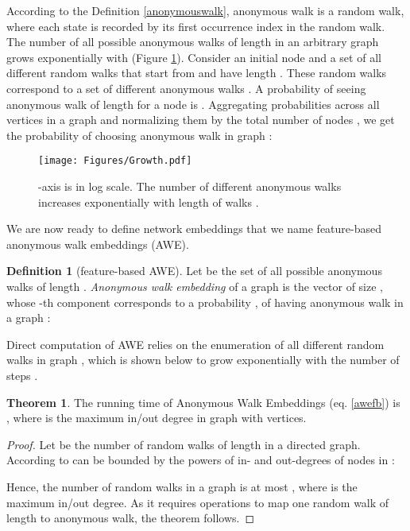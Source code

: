 \documentclass{article}
\theoremstyle{definition}
\newtheorem{definition}{Definition}
\newtheorem{theorem}{Theorem}
\begin{document}
According to the Definition \ref{anonymouswalk}, anonymous walk is a random walk, where each state is recorded by its first occurrence index in the random walk. The number of all possible anonymous walks of length  in an arbitrary graph grows exponentially with  (Figure \ref{growth}). Consider an initial node  and a set of all different random walks  that start from  and have length . These random walks correspond to a set of  different anonymous walks . A probability of seeing anonymous walk  of length  for a node  is . Aggregating probabilities across all vertices in a graph and normalizing them by the total number of nodes , we get the probability of choosing anonymous walk  in graph : 



\begin{figure}[h!]
\centering
    \texttt{[image: Figures/Growth.pdf]}
\caption{-axis is in log scale. The number of different anonymous walks increases exponentially with length of walks . }\label{growth}
\end{figure}

We are now ready to define network embeddings that we name feature-based anonymous walk embeddings (AWE). 
\begin{definition}[feature-based AWE]
Let  be the set of all possible anonymous walks of length . \textit{Anonymous walk embedding} of a graph  is the vector  of size , whose -th component corresponds to a probability , of having anonymous walk  in a graph :

\end{definition}

Direct computation of AWE relies on the enumeration of all different random walks in graph , which is shown below to grow exponentially with the number of steps .

\begin{theorem}
	The running time of Anonymous Walk Embeddings (eq. \ref{awefb}) is , where  is the maximum in/out degree in graph  with  vertices. 
\end{theorem}
\begin{proof}
	Let  be the number of random walks of length  in a directed graph. According to \cite{taubig2012}  can be bounded by the powers of in- and out-degrees of nodes in :
    
Hence, the number of random walks in a graph is at most , where  is the maximum in/out degree. As it requires  operations to map one random walk of length  to anonymous walk, the theorem follows.
\end{proof}
\end{document}
